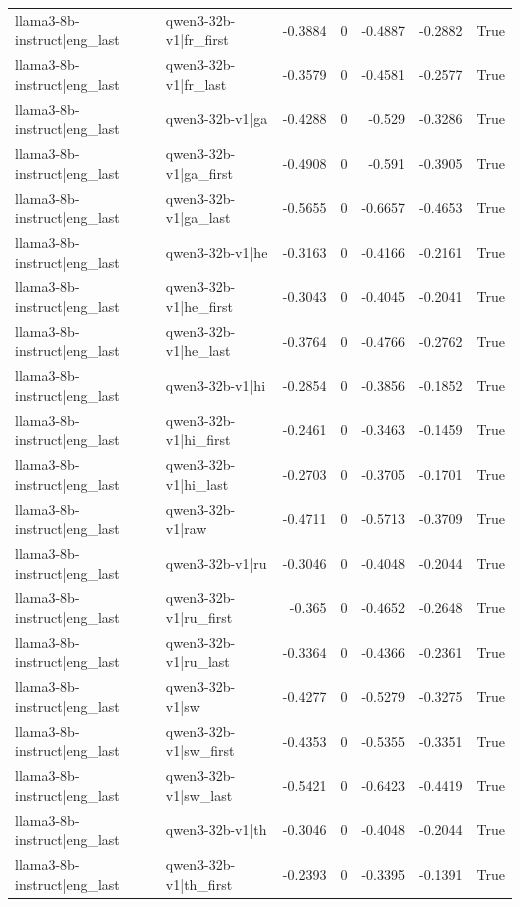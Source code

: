 \begin{table}
\begin{tabular}{l l r r r r l}
llama3-8b-instruct|eng_last & qwen3-32b-v1|fr_first & -0.3884 & 0 & -0.4887 & -0.2882 & True \\
llama3-8b-instruct|eng_last & qwen3-32b-v1|fr_last & -0.3579 & 0 & -0.4581 & -0.2577 & True \\
llama3-8b-instruct|eng_last & qwen3-32b-v1|ga & -0.4288 & 0 & -0.529 & -0.3286 & True \\
llama3-8b-instruct|eng_last & qwen3-32b-v1|ga_first & -0.4908 & 0 & -0.591 & -0.3905 & True \\
llama3-8b-instruct|eng_last & qwen3-32b-v1|ga_last & -0.5655 & 0 & -0.6657 & -0.4653 & True \\
llama3-8b-instruct|eng_last & qwen3-32b-v1|he & -0.3163 & 0 & -0.4166 & -0.2161 & True \\
llama3-8b-instruct|eng_last & qwen3-32b-v1|he_first & -0.3043 & 0 & -0.4045 & -0.2041 & True \\
llama3-8b-instruct|eng_last & qwen3-32b-v1|he_last & -0.3764 & 0 & -0.4766 & -0.2762 & True \\
llama3-8b-instruct|eng_last & qwen3-32b-v1|hi & -0.2854 & 0 & -0.3856 & -0.1852 & True \\
llama3-8b-instruct|eng_last & qwen3-32b-v1|hi_first & -0.2461 & 0 & -0.3463 & -0.1459 & True \\
llama3-8b-instruct|eng_last & qwen3-32b-v1|hi_last & -0.2703 & 0 & -0.3705 & -0.1701 & True \\
llama3-8b-instruct|eng_last & qwen3-32b-v1|raw & -0.4711 & 0 & -0.5713 & -0.3709 & True \\
llama3-8b-instruct|eng_last & qwen3-32b-v1|ru & -0.3046 & 0 & -0.4048 & -0.2044 & True \\
llama3-8b-instruct|eng_last & qwen3-32b-v1|ru_first & -0.365 & 0 & -0.4652 & -0.2648 & True \\
llama3-8b-instruct|eng_last & qwen3-32b-v1|ru_last & -0.3364 & 0 & -0.4366 & -0.2361 & True \\
llama3-8b-instruct|eng_last & qwen3-32b-v1|sw & -0.4277 & 0 & -0.5279 & -0.3275 & True \\
llama3-8b-instruct|eng_last & qwen3-32b-v1|sw_first & -0.4353 & 0 & -0.5355 & -0.3351 & True \\
llama3-8b-instruct|eng_last & qwen3-32b-v1|sw_last & -0.5421 & 0 & -0.6423 & -0.4419 & True \\
llama3-8b-instruct|eng_last & qwen3-32b-v1|th & -0.3046 & 0 & -0.4048 & -0.2044 & True \\
llama3-8b-instruct|eng_last & qwen3-32b-v1|th_first & -0.2393 & 0 & -0.3395 & -0.1391 & True \\

\end{tabular}
\end{table}
